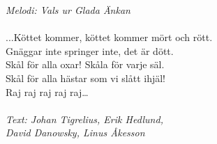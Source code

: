 {\footnotesize\textit{Melodi: Vals ur Glada Änkan}}\\
\\
...Köttet kommer, köttet kommer mört och rött.\\
Gnäggar inte springer inte, det är dött.\\
Skål för alla oxar! Skåla för varje säl.\\
Skål för alla hästar som vi slått ihjäl!\\
Raj raj raj raj raj…\\
\\
{\footnotesize\textit{Text: Johan Tigrelius, Erik Hedlund,\\ David Danowsky, Linus Åkesson}}
